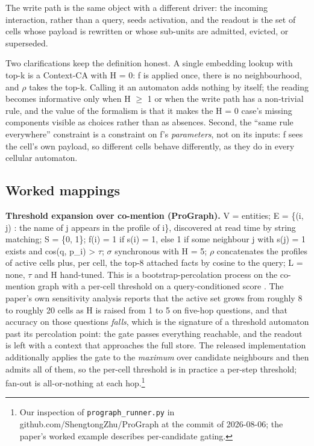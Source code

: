 \documentclass[11pt]{article}
\begin{document}
The write path is the same object with a different driver: the incoming interaction, rather than a query, seeds activation, and the readout is the set of cells whose payload is rewritten or whose sub-units are admitted, evicted, or superseded.

Two clarifications keep the definition honest. A single embedding lookup with top-k is a Context-CA with H = 0: f is applied once, there is no neighbourhood, and $\rho$ takes the top-k. Calling it an automaton adds nothing by itself; the reading becomes informative only when H $\geq$ 1 or when the write path has a non-trivial rule, and the value of the formalism is that it makes the H = 0 case's missing components visible as choices rather than as absences. Second, the ``same rule everywhere'' constraint is a constraint on f's \emph{parameters}, not on its inputs: f sees the cell's own payload, so different cells behave differently, as they do in every cellular automaton.

\subsection{Worked mappings}

\textbf{Threshold expansion over co-mention (ProGraph).} V = entities; E = \{(i, j) : the name of j appears in the profile of i\}, discovered at read time by string matching; S = \{0, 1\}; f(i) = 1 if s(i) = 1, else 1 if some neighbour j with s(j) = 1 exists and cos(q, p\_i) > $\tau$; $\sigma$ synchronous with H = 5; $\rho$ concatenates the profiles of active cells plus, per cell, the top-8 attached facts by cosine to the query; L = none, $\tau$ and H hand-tuned. This is a bootstrap-percolation process on the co-mention graph with a per-cell threshold on a query-conditioned score \cite{prograph}. The paper's own sensitivity analysis reports that the active set grows from roughly 8 to roughly 20 cells as H is raised from 1 to 5 on five-hop questions, and that accuracy on those questions \emph{falls}, which is the signature of a threshold automaton past its percolation point: the gate passes everything reachable, and the readout is left with a context that approaches the full store. The released implementation additionally applies the gate to the \emph{maximum} over candidate neighbours and then admits all of them, so the per-cell threshold is in practice a per-step threshold; fan-out is all-or-nothing at each hop.\footnote{Our inspection of \texttt{prograph\_runner.py} in github.com/ShengtongZhu/ProGraph at the commit of 2026-08-06; the paper's worked example describes per-candidate gating.}
\end{document}
